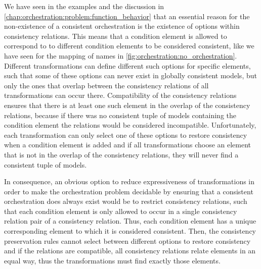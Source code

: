 We have seen in the examples and the discussion in \autoref{chap:orchestration:problem:function_behavior} that an essential reason for the non-existence of a consistent orchestration is the existence of options within consistency relations.
This means that a condition element is allowed to correspond to to different condition elements to be considered consistent, like we have seen for the mapping of names in \autoref{fig:orchestration:no_orchestration}.
Different transformations can define different such options for specific elements, such that some of these options can never exist in globally consistent models, but only the ones that overlap between the consistency relations of all transformations can occur there.
Compatibility of the consistency relations ensures that there is at least one such element in the overlap of the consistency relations, because if there was no consistent tuple of models containing the condition element the relations would be considered incompatible.
Unfortunately, each transformation can only select one of these options to restore consistency when a condition element is added and if all transformations choose an element that is not in the overlap of the consistency relations, they will never find a consistent tuple of models.

In consequence, an obvious option to reduce expressiveness of transformations in order to make the orchestration problem decidable by ensuring that a consistent orchestration does always exist would be to restrict consistency relations, such that each condition element is only allowed to occur in a single consistency relation pair of a consistency relation.
Thus, each condition element has a unique corresponding element to which it is considered consistent.
Then, the consistency preservation rules cannot select between different options to restore consistency and if the relations are compatible, all consistency relations relate elements in an equal way, thus the transformations must find exactly those elements.

